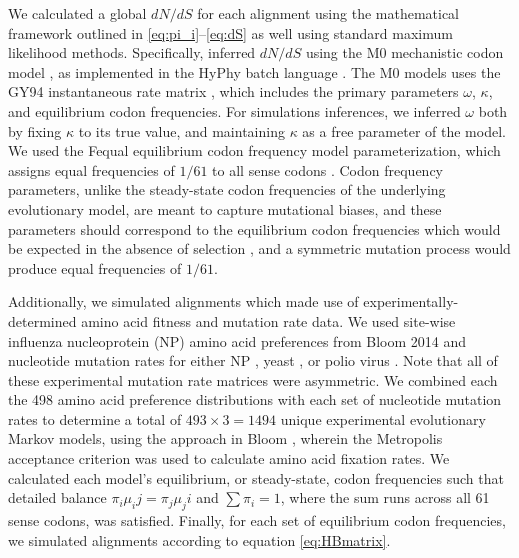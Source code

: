 \documentclass{pnastwo}
\begin{document}
We calculated a global $dN/dS$ for each alignment using the mathematical framework outlined in \eqref{eq:pi_i}--\eqref{eq:dS} as well using standard maximum likelihood methods. Specifically, inferred $dN/dS$ using the M0 mechanistic codon model \cite{Yangetal2000}, as implemented in the HyPhy batch language \cite{KosakovskyPondetal2005}. The M0 models uses the GY94 instantaneous rate matrix \cite{GoldmanYang1994,NielsenYang1998}, which includes the primary parameters $\omega$, $\kappa$, and equilibrium codon frequencies. For simulations inferences, we inferred $\omega$ both by fixing $\kappa$ to its true value, and maintaining $\kappa$ as a free parameter of the model. We used the Fequal equilibrium codon frequency model parameterization, which assigns equal frequencies of $1/61$ to all sense codons \cite{Yang2006}. Codon frequency parameters, unlike the steady-state codon frequencies of the underlying evolutionary model, are meant to capture mutational biases, and these parameters should correspond to the equilibrium codon frequencies which would be expected in the absence of selection \cite{YN00}, and a symmetric mutation process would produce equal frequencies of $1/61$.


Additionally, we simulated alignments which made use of experimentally-determined amino acid fitness and mutation rate data. We used site-wise influenza nucleoprotein (NP) amino acid preferences from Bloom 2014 \cite{Bloom2014a} and nucleotide mutation rates for either NP \cite{Bloom2014a}, yeast \cite{Zhu2014}, or polio virus \cite{Acevedo2014}. Note that all of these experimental mutation rate matrices were asymmetric. We combined each the 498 amino acid preference distributions with each set of nucleotide mutation rates to determine a total of $493 \times 3 = 1494$ unique experimental evolutionary Markov models, using the approach in Bloom \cite{Bloom2014a}, wherein the Metropolis acceptance criterion \cite{Metropolis1953} was used to calculate amino acid fixation rates. We calculated each model's equilibrium, or steady-state, codon frequencies such that detailed balance $\pi_i\mu_ij = \pi_j\mu_ji$ and $\sum\pi_i = 1$, where the sum runs across all 61 sense codons, was satisfied. Finally, for each set of equilibrium codon frequencies, we simulated alignments according to equation \eqref{eq:HBmatrix}.
\end{document}
